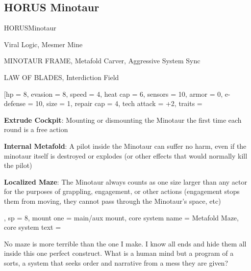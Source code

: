 \subsection{HORUS Minotaur}

\begin{mech}{HORUS}{Minotaur}


\begin{license}
\item Viral Logic, Mesmer Mine
\item MINOTAUR FRAME, Metafold Carver, Aggressive System Sync
\item LAW OF BLADES, Interdiction Field
\end{license}


\frameBox
[hp = 8,
evasion = 8,
speed = 4,
heat cap = 6,
sensors = 10,
armor = 0,
e-defense = 10,
size = 1,
repair cap = 4,
tech attack = +2,
traits = {
      \textbf{Extrude Cockpit}: Mounting or dismounting the Minotaur the first time each round is a free action

      \textbf{Internal Metafold}: A pilot inside the Minotaur can suffer no harm, even if the minotaur itself is destroyed or explodes (or other effects that would normally kill the pilot)

      \textbf{Localized Maze}: The Minotaur always counts as one size larger than any actor for the purposes of grappling, engagement, or other actions (engagement stops them from moving, they cannot pass through the Minotaur’s space, etc)
      },
sp = 8,
mount one = main/aux mount,
core system name = Metafold Maze,
core system text = {No maze is more terrible than the one I make. I know all ends and hide them all inside this one perfect construct. What is a human mind but a program of a sorts, a system that seeks order and narrative from a mess they are given?

}
\end{mech}
